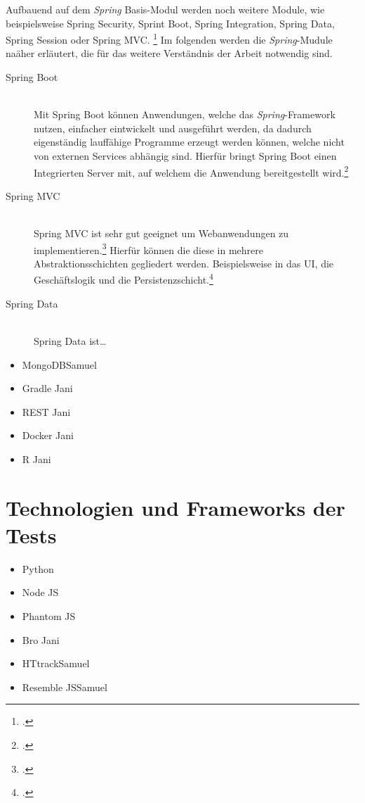 Aufbauend auf dem \textit{Spring} Basis-Modul werden noch weitere Module, wie beispielsweise Spring Security, Sprint Boot, Spring Integration, Spring Data, Spring Session oder Spring MVC. \footcite[Vgl.][2]{springPivotal} Im folgenden werden die \textit{Spring}-Mudule naäher erläutert, die für das weitere Verständnis der Arbeit notwendig sind.

\begin{description}
  \item[Spring Boot] \hfill \\
    Mit Spring Boot können Anwendungen, welche das \textit{Spring}-Framework nutzen, einfacher eintwickelt und ausgeführt werden, da dadurch eigenständig lauffähige Programme erzeugt werden können, welche nicht von externen Services abhängig sind. Hierfür bringt Spring Boot einen Integrierten Server mit, auf welchem die Anwendung bereitgestellt wird.\footcite[Vgl.][1]{springBoot}
  \item[Spring MVC] \hfill \\
    Spring MVC ist sehr gut geeignet um Webanwendungen zu implementieren.\footcite[Vgl.][3]{spring3} Hierfür können die diese in mehrere Abstraktionsschichten gegliedert werden. Beispielsweise in das \ac{UI}, die Geschäftslogik und die Persistenzschicht.\footcite[Vgl.][21]{springMvc}
  \item[Spring Data] \hfill \\
    Spring Data ist\ldots
\end{description}

\begin{itemize}
  \item MongoDB\newline \todo Samuel
  \item Gradle  \newline \todo Jani
  \item REST  \newline \todo Jani
  \item Docker  \newline \todo Jani
  \item R \newline \todo Jani
\end{itemize}

\section{Technologien und Frameworks der Tests}

\begin{itemize}
    \item Python \newline {}
    \item Node JS
    \item Phantom JS \newline {}
    \item Bro \newline \todo Jani
    \item HTtrack\newline \todo Samuel
    \item Resemble JS\newline \todo Samuel
\end{itemize}


